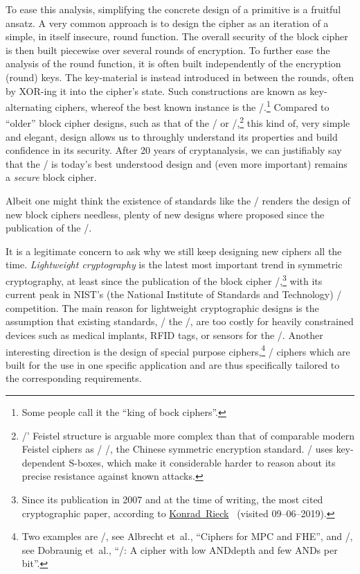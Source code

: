 To ease this analysis, simplifying the concrete design of a primitive is a fruitful ansatz.
A very common approach is to design the cipher as an iteration of a simple, in itself insecure, round function.
The overall security of the block cipher is then built piecewise over several rounds of encryption.
To further ease the analysis of the round function, it is often built independently of the encryption (round) keys.
The key-material is instead introduced in between the rounds, often by XOR-ing it into the cipher's state.
Such constructions are known as key-alternating ciphers, whereof the best known instance is the \AES/.\footnote{%
    Some people call it the \enquote{king of bock ciphers}.
}
Compared to \enquote{older} block cipher designs, such as that of the \DES/ or \blowfish/,\footnote{%
    \DES/' Feistel structure is arguable more complex than that of comparable modern Feistel ciphers as \eg/ /, the Chinese symmetric encryption standard.
    \blowfish/ uses key-dependent S-boxes, which make it considerable harder to reason about its precise resistance against known attacks.
} this kind of, very simple and elegant, design allows us to throughly understand its properties and build confidence in its security.
After 20 years of cryptanalysis, we can justifiably say that the \AES/ is today's best understood design and (even more important) remains a \emph{secure} block cipher.

Albeit one might think the existence of standards like the \AES/ renders the design of new block ciphers needless, plenty of new designs where proposed since the publication of the \AES/.

It is a legitimate concern to ask why we still keep designing new ciphers all the time.
\emph{Lightweight cryptography} is the latest most important trend in symmetric cryptography, at least since the publication of the block cipher \present/,\footnote{%
    Since its publication in 2007 and at the time of writing, the most cited cryptographic paper, according to \href{https://www.sec.cs.tu-bs.de/~konrieck/topnotch/crypto_top100.html}{Konrad~Rieck}~ (visited 09--06--2019).
} with its current peak in NIST's (the National Institute of Standards and Technology) \LWC/ competition.
The main reason for lightweight cryptographic designs is the assumption that existing standards, \eg/ the \AES/, are too costly for heavily constrained devices such as medical implants, RFID tags, or sensors for the \iot/.
Another interesting direction is the design of special purpose ciphers,\footnote{%
    Two examples are \lowmc/, see Albrecht et~al., \enquote{Ciphers for MPC and FHE}, and \rasta/, see Dobraunig et~al., \enquote{\rasta/: A cipher with low ANDdepth and few ANDs per bit}.
} \ie/ ciphers which are built for the use in one specific application and are thus specifically tailored to the corresponding requirements.

